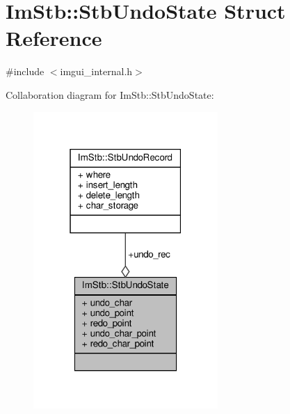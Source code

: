\hypertarget{structImStb_1_1StbUndoState}{}\section{Im\+Stb\+:\+:Stb\+Undo\+State Struct Reference}
\label{structImStb_1_1StbUndoState}


{\ttfamily \#include $<$imgui\+\_\+internal.\+h$>$}



Collaboration diagram for Im\+Stb\+:\+:Stb\+Undo\+State\+:
\nopagebreak
\begin{figure}[H]
\begin{center}
\leavevmode
\includegraphics[width=199pt]{structImStb_1_1StbUndoState__coll__graph}
\end{center}
\end{figure}
